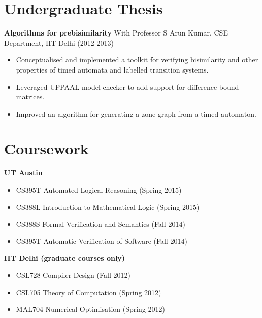 \documentclass[margin]{res}
\begin{document}
\begin{resume}
\section{Undergraduate Thesis} 
        {\bf Algorithms for prebisimilarity} With Professor S
        Arun Kumar, CSE Department, IIT Delhi    \hfill
        (2012-2013) 
        \begin{itemize} \itemsep -2pt
        \item Conceptualised and implemented a toolkit for
          verifying bisimilarity and other properties of timed automata
          and labelled transition systems.
        \item Leveraged UPPAAL model checker to add support
          for difference bound matrices.
        \item Improved an algorithm for generating a zone
          graph from a timed automaton.

	\end{itemize}

\section{Coursework}
        {\bf UT Austin}
        \begin{itemize} \itemsep -2pt
        \item CS395T Automated Logical Reasoning \hfill (Spring 2015)
        \item CS388L Introduction to Mathematical Logic \hfill (Spring 2015)
        \item CS388S Formal Verification and Semantics \hfill (Fall
          2014)
        \item CS395T Automatic Verification of Software \hfill (Fall
          2014)
        \end{itemize}

        {\bf IIT Delhi (graduate courses only)}
        \begin{itemize} \itemsep -2pt
        \item CSL728 Compiler Design \hfill (Fall 2012)
        \item CSL705 Theory of Computation \hfill (Spring 2012)
        \item MAL704 Numerical Optimisation \hfill (Spring 2012)
        \end{itemize}


\end{resume}
\end{document}
